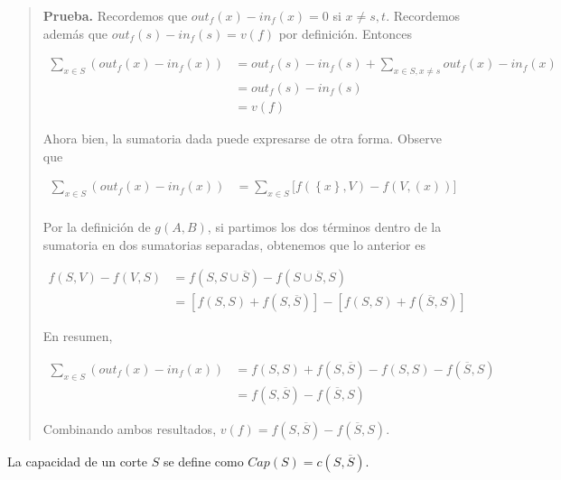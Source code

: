 \documentclass[a4paper]{article}
\begin{document}
\small
\begin{quote}

\textbf{Prueba.} Recordemos que $out_f (x) - in_f(x) = 0$ si $x \neq s, t$.
Recordemos además que $out_f(s) - in_f(s) = v(f)$ por definición. Entonces 

\begin{align*}
    \sum_{x \in S} \left( out_f(x) - in_f(x) \right) &= out_f(s) - in_f(s) +
    \sum_{x \in S, x \neq s} out_f(x) - in_f(x)  \\ 
                                                     &= out_f(s) - in_f(s) \\ 
                                                     &= v(f)
\end{align*}

Ahora bien, la sumatoria dada puede expresarse de otra forma. Observe que 

\begin{align*}
    \sum_{x \in S} \left( out_f(x) - in_f(x) \right)  &= \sum_{x \in S} \Big[f\left(
    \left\{ x \right\}, V \right) - f(V, \left( x \right) )\Big] \\ 
\end{align*}

Por la definición de $g(A, B)$, si partimos los dos términos dentro de la
sumatoria en dos sumatorias separadas, obtenemos que lo anterior es

\begin{align*}
    f(S, V) - f(V, S) &= f(S, S \cup \overline{S}) - f(S \cup \overline{S}, S)
    \\ 
                      &=\left[ f(S, S) + f(S, \overline{S}) \right]  - \left[
                      f(S, S) + f(\overline{S}, S) \right] 
\end{align*}

En resumen, 

\begin{align*}
    \sum_{x \in S}\left( out_f(x) - in_f(x) \right)  &= f(S, S) + f(S,
    \overline{S}) - f(S, S) - f(\overline{S}, S) \\ 
                                                     &= f(S, \overline{S}) -
                                                     f(\overline{S}, S)
\end{align*}

Combinando ambos resultados, $v(f) = f(S, \overline{S}) - f(\overline{S}, S)$.

\end{quote}
\normalsize

\begin{definition}
    La capacidad de un corte $S$ se define como $Cap(S) = c(S, \overline{S})$.
\end{definition}
\end{document}
